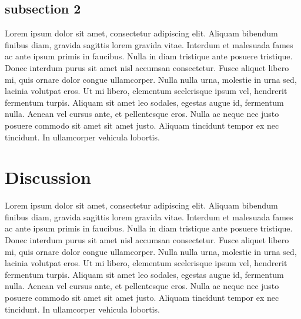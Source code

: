 \documentclass[10pt,letterpaper,twocolumn]{article}
\begin{document}
\subsection*{subsection 2}
Lorem ipsum dolor sit amet, consectetur adipiscing elit. Aliquam bibendum
finibus diam, gravida sagittis lorem gravida vitae. Interdum et malesuada fames
ac ante ipsum primis in faucibus. Nulla in diam tristique ante posuere
tristique. Donec interdum purus sit amet nisl accumsan consectetur. Fusce
aliquet libero mi, quis ornare dolor congue ullamcorper. Nulla nulla urna,
molestie in urna sed, lacinia volutpat eros. Ut mi libero, elementum scelerisque
ipsum vel, hendrerit fermentum turpis. Aliquam sit amet leo sodales, egestas
augue id, fermentum nulla. Aenean vel cursus ante, et pellentesque eros. Nulla
ac neque nec justo posuere commodo sit amet sit amet justo. Aliquam tincidunt
tempor ex nec tincidunt. In ullamcorper vehicula lobortis.

\section*{Discussion}

Lorem ipsum dolor sit amet, consectetur adipiscing elit. Aliquam bibendum
finibus diam, gravida sagittis lorem gravida vitae. Interdum et malesuada fames
ac ante ipsum primis in faucibus. Nulla in diam tristique ante posuere
tristique. Donec interdum purus sit amet nisl accumsan consectetur. Fusce
aliquet libero mi, quis ornare dolor congue ullamcorper. Nulla nulla urna,
molestie in urna sed, lacinia volutpat eros. Ut mi libero, elementum scelerisque
ipsum vel, hendrerit fermentum turpis. Aliquam sit amet leo sodales, egestas
augue id, fermentum nulla. Aenean vel cursus ante, et pellentesque eros. Nulla
ac neque nec justo posuere commodo sit amet sit amet justo. Aliquam tincidunt
tempor ex nec tincidunt. In ullamcorper vehicula lobortis.



\end{document}
